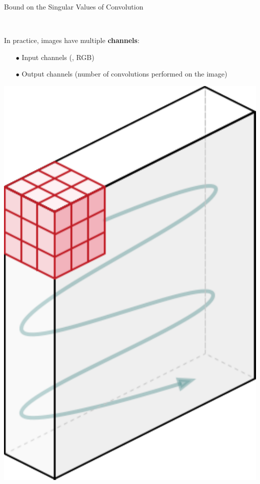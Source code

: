 \begin{frame}{Bound on the Singular Values of Convolution}
  

  \begin{minipage}{\textwidth}
    \centering
    \begin{minipage}{0.53\textwidth}
      In practice, images have multiple \textbf{channels}:
      {\small
      \begin{itemize}
	\item[$\bullet$] Input channels (\eg, RGB)
	\item[$\bullet$] Output channels (number of convolutions performed on the image)
      \end{itemize}
      }
    \end{minipage}
    \begin{minipage}{0.44\textwidth}
      \centering
      \includegraphics[scale=0.17]{images/conv_2d.pdf}
    \end{minipage}
  \end{minipage}



\end{frame}
